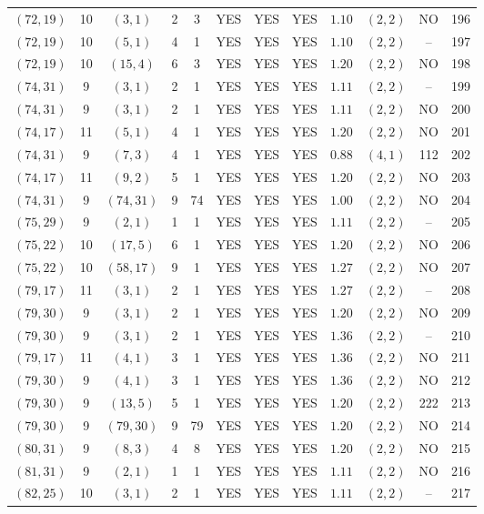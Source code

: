 \begin{longtable}{|c|c|c|c|c|c|c|c|c|c|c|c|}
$(72,19)$ & 10 & $(3,1)$ & 2 & 3 & YES & YES & YES & $1.10$ & $(2,2)$ & NO & 196\\
$(72,19)$ & 10 & $(5,1)$ & 4 & 1 & YES & YES & YES & $1.10$ & $(2,2)$ & -- & 197\\
$(72,19)$ & 10 & $(15,4)$ & 6 & 3 & YES & YES & YES & $1.20$ & $(2,2)$ & NO & 198\\
$(74,31)$ & 9 & $(3,1)$ & 2 & 1 & YES & YES & YES & $1.11$ & $(2,2)$ & -- & 199\\
$(74,31)$ & 9 & $(3,1)$ & 2 & 1 & YES & YES & YES & $1.11$ & $(2,2)$ & NO & 200\\
$(74,17)$ & 11 & $(5,1)$ & 4 & 1 & YES & YES & YES & $1.20$ & $(2,2)$ & NO & 201\\
$(74,31)$ & 9 & $(7,3)$ & 4 & 1 & YES & YES & YES & $0.88$ & $(4,1)$ & 112 & 202\\
$(74,17)$ & 11 & $(9,2)$ & 5 & 1 & YES & YES & YES & $1.20$ & $(2,2)$ & NO & 203\\
$(74,31)$ & 9 & $(74,31)$ & 9 & 74 & YES & YES & YES & $1.00$ & $(2,2)$ & NO & 204\\
$(75,29)$ & 9 & $(2,1)$ & 1 & 1 & YES & YES & YES & $1.11$ & $(2,2)$ & -- & 205\\
$(75,22)$ & 10 & $(17,5)$ & 6 & 1 & YES & YES & YES & $1.20$ & $(2,2)$ & NO & 206\\
$(75,22)$ & 10 & $(58,17)$ & 9 & 1 & YES & YES & YES & $1.27$ & $(2,2)$ & NO & 207\\
$(79,17)$ & 11 & $(3,1)$ & 2 & 1 & YES & YES & YES & $1.27$ & $(2,2)$ & -- & 208\\
$(79,30)$ & 9 & $(3,1)$ & 2 & 1 & YES & YES & YES & $1.20$ & $(2,2)$ & NO & 209\\
$(79,30)$ & 9 & $(3,1)$ & 2 & 1 & YES & YES & YES & $1.36$ & $(2,2)$ & -- & 210\\
$(79,17)$ & 11 & $(4,1)$ & 3 & 1 & YES & YES & YES & $1.36$ & $(2,2)$ & NO & 211\\
$(79,30)$ & 9 & $(4,1)$ & 3 & 1 & YES & YES & YES & $1.36$ & $(2,2)$ & NO & 212\\
$(79,30)$ & 9 & $(13,5)$ & 5 & 1 & YES & YES & YES & $1.20$ & $(2,2)$ & 222 & 213\\
$(79,30)$ & 9 & $(79,30)$ & 9 & 79 & YES & YES & YES & $1.20$ & $(2,2)$ & NO & 214\\
$(80,31)$ & 9 & $(8,3)$ & 4 & 8 & YES & YES & YES & $1.20$ & $(2,2)$ & NO & 215\\
$(81,31)$ & 9 & $(2,1)$ & 1 & 1 & YES & YES & YES & $1.11$ & $(2,2)$ & NO & 216\\
$(82,25)$ & 10 & $(3,1)$ & 2 & 1 & YES & YES & YES & $1.11$ & $(2,2)$ & -- & 217\\

\end{longtable}
